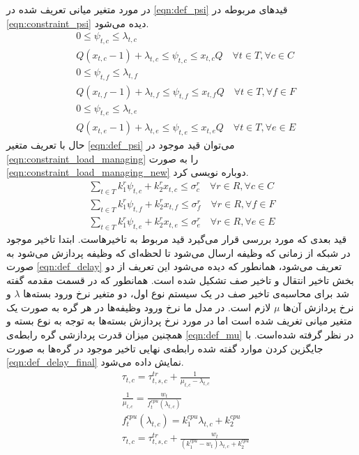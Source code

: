 	در مورد متغیر میانی تعریف شده در \cref{eqn:def_psi} قیدهای مربوطه در \cref{eqn:constraint_psi} دیده می‌شود. 
	\begin{subequations}\label{eqn:constraint_psi}
		\begin{align}
		&0 \leq \psi_{t,c} \leq \lambda_{t,c} \\
		&Q(x_{t,c}-1)+\lambda_{t,c} \leq \psi_{t,c} \leq x_{t,c}Q \quad \forall{t\in T}, \forall{c \in C} \\
		&0 \leq \psi_{t,f} \leq \lambda_{t,f} \\
		&Q(x_{t,f}-1)+\lambda_{t,f} \leq \psi_{t,f} \leq x_{t,f}Q \quad \forall{t \in T}, \forall{f \in F} \\
		&0 \leq \psi_{t,e} \leq \lambda_{t,e} \\
		&Q(x_{t,e}-1)+\lambda_{t,e} \leq \psi_{t,e} \leq x_{t,e}Q \quad \forall{t \in T}, \forall{e \in E}
		\end{align}
	\end{subequations}
	حال با تعریف متغیر \cref{eqn:def_psi} می‌توان قید موجود در \cref{eqn:constraint_load_managing} را به صورت \cref{eqn:constraint_load_managing_new} دوباره نویسی کرد. 
	\begin{subequations}\label{eqn:constraint_load_managing_new}
		\begin{align}
		\sum_{t \in T}k_1^r\psi_{t,c}+k_2^rx_{t,c} \le \sigma_c^r \quad \forall{r \in R}, \forall{c \in C} \\
		\sum_{t \in T}k_1^r\psi_{t,f}+k_2^rx_{t,f} \le \sigma_f^r \quad \forall{r \in R}, \forall{f \in F} \\
		\sum_{t \in T}k_1^r\psi_{t,e}+k_2^rx_{t,e} \le \sigma_e^r \quad \forall{r \in R}, \forall{e \in E}
		\end{align}
	\end{subequations}
	قید بعدی که مورد بررسی قرار می‌گیرد قید مربوط به تاخیرهاست. ابتدا تاخیر موجود در شبکه از زمانی که وظیفه ارسال می‌شود تا لحظه‌ای که وظیفه پردازش می‌شود به صورت \cref{eqn:def_delay} تعریف می‌شود، همانطور که دیده می‌شود این تعریف از دو بخش تاخیر انتقال و تاخیر صف تشکیل شده است. 
همانطور که در قسمت مقدمه گفته شد برای محاسبه‌ی تاخیر صف در یک سیستم نوع اول، دو متغیر نرخ ورود بسته‌ها $\lambda$ و نرخ پردازش آن‌ها $\mu$ لازم است. در مدل ما نرخ ورود وظیفه‌ها در هر گره به صورت یک متغیر میانی تغریف شده است اما در مورد نرخ پردازش بسته‌ها به توجه به نوع بسته و همچنین میزان قدرت پردازشی گره رابطه‌ی \cref{eqn:def_mu} در نظر گرفته شده‌است. با جایگزین کردن موارد گفته شده رابطه‌ی نهایی تاخیر موجود در گره‌ها به صورت \cref{eqn:def_delay_final} نمایش داده می‌شود. 
	\begin{subequations}
		\begin{align}
			&\tau_{t,c} = \tau_{t,s,c}^{tr} + \frac{1}{\mu_{t,c}-\lambda_{t,c}} \label{eqn:def_delay}\\
			&\frac{1}{\mu_{t,c}} = \frac{w_t}{f_t^{cpu}(\lambda_{t,c})} \label{eqn:def_mu}\\
			&f_t^{cpu}(\lambda_{t,c}) = k_1^{cpu}\lambda_{t,c}+k_2^{cpu} \\
			&\tau_{t,c} = \tau_{t,s,c}^{tr} + \frac{w_t}{(k_1^{cpu}-w_t)\lambda_{t,c} + k_2^{cpu}} \label{eqn:def_delay_final}
		\end{align}
	\end{subequations}
